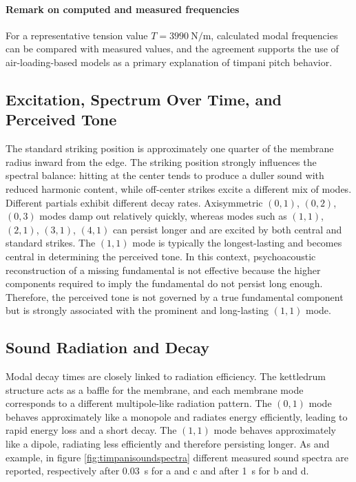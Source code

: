 \paragraph{Remark on computed and measured frequencies} For a representative tension value \( T = \SI{3990}{\newton\per\meter} \), calculated modal frequencies can be compared with measured values, and the agreement supports the use of air-loading-based models as a primary explanation of timpani pitch behavior.

\subsection{Excitation, Spectrum Over Time, and Perceived Tone}

The standard striking position is approximately one quarter of the membrane radius inward from the edge. The striking position strongly influences the spectral balance: hitting at the center tends to produce a duller sound with reduced harmonic content, while off-center strikes excite a different mix of modes. Different partials exhibit different decay rates. Axisymmetric \((0, 1)\), \((0, 2)\), \((0, 3)\) modes damp out relatively quickly, whereas modes such as \((1, 1)\), \((2, 1)\), \((3, 1)\), \((4, 1)\) can persist longer and are excited by both central and standard strikes. The \((1, 1)\) mode is typically the longest-lasting and becomes central in determining the perceived tone. In this context, psychoacoustic reconstruction of a missing fundamental is not effective because the higher components required to imply the fundamental do not persist long enough. Therefore, the perceived tone is not governed by a true fundamental component but is strongly associated with the prominent and long-lasting \((1, 1)\) mode.

\subsection{Sound Radiation and Decay}

Modal decay times are closely linked to radiation efficiency. The kettledrum structure acts as a baffle for the membrane, and each membrane mode corresponds to a different multipole-like radiation pattern. The \((0, 1)\) mode behaves approximately like a monopole and radiates energy efficiently, leading to rapid energy loss and a short decay. The \((1, 1)\) mode behaves approximately like a dipole, radiating less efficiently and therefore persisting longer. As and example, in figure \ref{fig:timpanisoundspectra} different measured sound spectra are reported, respectively after \SI{0.03}{\second} for a and c and after \SI{1}{\second} for b and d.

